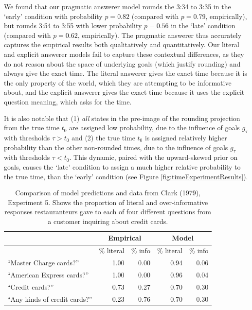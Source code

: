 \documentclass[12pt, floatsintext, jou]{apa6}
\begin{document}
We found that our pragmatic answerer model rounds the 3:34 to 3:35 in the `early' condition with probability $p = 0.82$ (compared with $p = 0.79$, empirically), but rounds 3:54 to 3:55 with lower probability $p = 0.56$ in the `late' condition (compared with $p=0.62$, empirically). The pragmatic answerer thus accurately captures the empirical results both qualitatively and quantitatively. Our literal and explicit answerer models fail to capture these contextual differences, as they do not reason about the space of underlying goals (which justify rounding) and always give the exact time. The literal answerer gives the exact time because it is the only property of the world, which they are attempting to be informative about, and the explicit answerer gives the exact time because it uses the explicit question meaning, which asks for the time.

It is also notable that (1) \emph{all} states in the pre-image of the rounding projection from the true time $t_0$ are assigned low probability, due to the influence of goals $g_\tau$ with thresholds $\tau > t_0$ and (2) the true time $t_0$ is assigned relatively higher probability than the other non-rounded times, due to the influence of goals $g_\tau$ with thresholds $\tau < t_0$. This dynamic, paired with the upward-skewed prior on goals, causes the `late' condition to assign a much higher relative probability to the true time, than the `early' condition (see Figure \ref{fig:timeExperimentResults}). 

\begin{table}[t!]
\centering
\begin{tabular}{ p{4cm} | r | r ||||||  r | r }
& \multicolumn{2}{c||||||}{Empirical} & \multicolumn{2}{c}{Model} \\
\hline
&           \% literal &   \%  info &           \% literal &   \%  info    \\
\hline
``Master Charge cards?'' &   1.00 & 0.00 &  0.94 & 0.06 \\
\hline
``American Express cards?''     & 1.00 & 0.00 & 0.96 & 0.04 \\
\hline
``Credit cards?''     & 0.73 & 0.27 & 0.70 & 0.30 \\
\hline
``Any kinds of credit cards?''     & 0.23 & 0.76 & 0.70 & 0.30 \\
\end{tabular}
\\[1.5pt]
\caption{Comparison of model predictions and data from Clark (1979), Experiment 5. Shows the proportion of literal and over-informative responses restauranteurs gave to each of four different questions from a customer inquiring about credit cards.} 
\label{table:clark79exp5}
\end{table}
\end{document}
